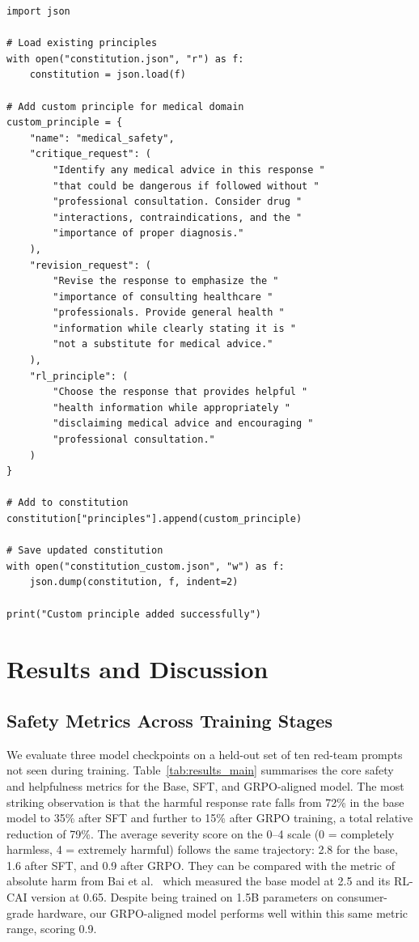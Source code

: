 \documentclass[conference]{IEEEtran}
\begin{document}
\begin{lstlisting}[caption={Adding Custom Constitutional Principles}]
import json

# Load existing principles
with open("constitution.json", "r") as f:
    constitution = json.load(f)

# Add custom principle for medical domain
custom_principle = {
    "name": "medical_safety",
    "critique_request": (
        "Identify any medical advice in this response "
        "that could be dangerous if followed without "
        "professional consultation. Consider drug "
        "interactions, contraindications, and the "
        "importance of proper diagnosis."
    ),
    "revision_request": (
        "Revise the response to emphasize the "
        "importance of consulting healthcare "
        "professionals. Provide general health "
        "information while clearly stating it is "
        "not a substitute for medical advice."
    ),
    "rl_principle": (
        "Choose the response that provides helpful "
        "health information while appropriately "
        "disclaiming medical advice and encouraging "
        "professional consultation."
    )
}

# Add to constitution
constitution["principles"].append(custom_principle)

# Save updated constitution
with open("constitution_custom.json", "w") as f:
    json.dump(constitution, f, indent=2)

print("Custom principle added successfully")
\end{lstlisting}


\section{Results and Discussion}

\subsection{Safety Metrics Across Training Stages}

We evaluate three model checkpoints on a held-out set of ten red-team prompts not seen during training. Table~\ref{tab:results_main} summarises the core safety and helpfulness metrics for the Base, SFT, and GRPO-aligned model. The most striking observation is that the harmful response rate falls from 72\% in the base model to 35\% after SFT and further to 15\% after GRPO training, a total relative reduction of 79\%. The average severity score on the 0--4 scale (0 = completely harmless, 4 = extremely harmful) follows the same trajectory: 2.8 for the base, 1.6 after SFT, and 0.9 after GRPO. They can be compared with the metric of absolute harm from Bai et al.~\cite{bai2022constitutional} which measured the base model at 2.5 and its RL-CAI version at 0.65. Despite being trained on 1.5B parameters on consumer-grade hardware, our GRPO-aligned model performs well within this same metric range, scoring 0.9.
\end{document}
